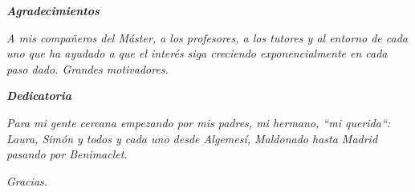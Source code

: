 %
% 

\null
\vfill

\begin{flushright}
    \par \emph{\textbf{Agradecimientos}}
    
    \par \emph{A mis compañeros del Máster, a los profesores, a los tutores y al entorno de cada uno que ha ayudado a que el inter\'es siga creciendo exponencialmente en cada paso dado. Grandes motivadores.}

    \par \emph{\textbf{Dedicatoria}}
    
    \par \emph{Para mi gente cercana empezando por mis padres, mi hermano, ``mi querida``: Laura, Simón y todos y cada uno desde Algemes\'i, Maldonado hasta Madrid pasando por Benimaclet.}

    \par \emph{Gracias.}
\end{flushright}